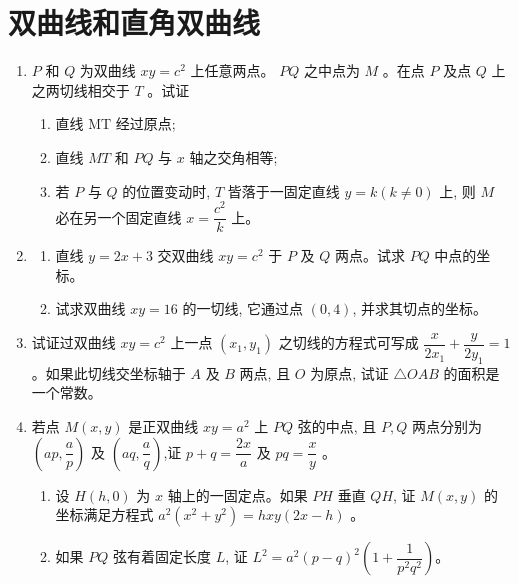 \documentclass[10pt]{article}
\begin{document}
\section*{双曲线和直角双曲线}
\begin{enumerate}
  \item $P$ 和 $Q$ 为双曲线 $x y=c^{2}$ 上任意两点。 $PQ$ 之中点为 $M$ 。在点 $P$ 及点 $Q$ 上之两切线相交于 $T$ 。试证
  \begin{enumerate}
    \item 直线 MT 经过原点;
    \item 直线 $M T$ 和 $P Q$ 与 $x$ 轴之交角相等;
    \item 若 $P$ 与 $Q$ 的位置变动时, $T$ 皆落于一固定直线 $y=k(k \neq 0)$ 上, 则 $M$ 必在另一个固定直线 $x=\dfrac{c^{2}}{k}$ 上。
  \end{enumerate}
  
  \item \begin{enumerate}
    \item 直线 $y=2 x+3$ 交双曲线 $x y=c^{2}$ 于 $P$ 及 $Q$ 两点。试求 $PQ$ 中点的坐标。

    \item 试求双曲线 $x y=16$ 的一切线, 它通过点 $(0,4)$, 并求其切点的坐标。
  \end{enumerate}

  \item 试证过双曲线 $x y=c^{2}$ 上一点 $\left(x_{1}, y_{1}\right)$ 之切线的方程式可写成 $\dfrac{x}{2 x_{1}}+\dfrac{y}{2 y_{1}}=1$ 。如果此切线交坐标轴于 $A$ 及 $B$ 两点, 且 $O$ 为原点, 试证 $\triangle O A B$ 的面积是一个常数。
  
  \item 若点 $M(x, y)$ 是正双曲线 $x y=a^{2}$ 上 $PQ$ 弦的中点, 且 $P, Q$ 两点分别为 $\left(a p, \dfrac{a}{p}\right)$ 及 $\left(a q, \dfrac{a}{q}\right)$,证 $p+q=\dfrac{2 x}{a}$ 及 $p q=\dfrac{x}{y}$ 。

  \begin{enumerate}
    \item 设 $H(h, 0)$ 为 $x$ 轴上的一固定点。如果 $PH$ 垂直 $QH$, 证 $M(x, y)$ 的坐标满足方程式 $a^{2}\left(x^{2}+y^{2}\right)=h x y(2 x-h)$ 。

    \item 如果 $PQ$ 弦有着固定长度 $L$, 证 $L^{2}=a^{2}(p-q)^{2}\left(1+\dfrac{1}{p^{2} q^{2}}\right) 。$
  \end{enumerate}


\end{enumerate}
\end{document}
